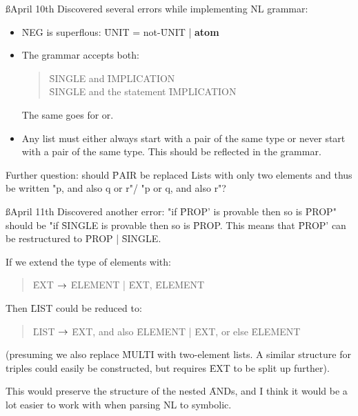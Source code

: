 \documentclass[a4paper]{article}
\begin{document}
\ss{April 10th}
Discovered several errors while implementing NL grammar:
\begin{itemize}
    \item \f{NEG} is superflous: \f{UNIT} = not-\f{UNIT} | {\bf atom}
    \item The grammar accepts both:
        \begin{quote}\f{SINGLE} and \f{IMPLICATION}\\
                     \f{SINGLE} and the statement \f{IMPLICATION}
        \end{quote}
        The same goes for or.
    \item Any list must either always start with a pair of the same type or
    never start with a pair of the same type. This should be reflected in 
    the grammar.
\end{itemize}
Further question: should \f{PAIR} be replaced Lists with only two elements
and thus be written "p, and also q or r"/ "p or q, and also r"?

\ss{April 11th}
Discovered another error: "if \f{PROP'} is provable then so is \f{PROP}"
should be "if \f{SINGLE} is provable then so is \f{PROP}. This means that
\f{PROP'} can be restructured to \f{PROP} | \f{SINGLE}.

If we extend the type of elements with:
\begin{quote}
    \f{EXT } $\rightarrow$ \f{ELEMENT} | \f{EXT}, \f{ELEMENT}
\end{quote}
Then \f{LIST} could be reduced to:
\begin{quote}
    \f{LIST} $\rightarrow$ \f{EXT}, and also \f{ELEMENT} 
                 | \f{EXT}, or else  \f{ELEMENT}
\end{quote}
(presuming we also replace \f{MULTI} with two-element lists. A similar
structure for triples could easily be constructed, but requires \f{EXT} to
be split up further).

This would preserve the structure of the nested \f{AND}s, and I think it
would be a lot easier to work with when parsing NL to symbolic.
\end{document}
